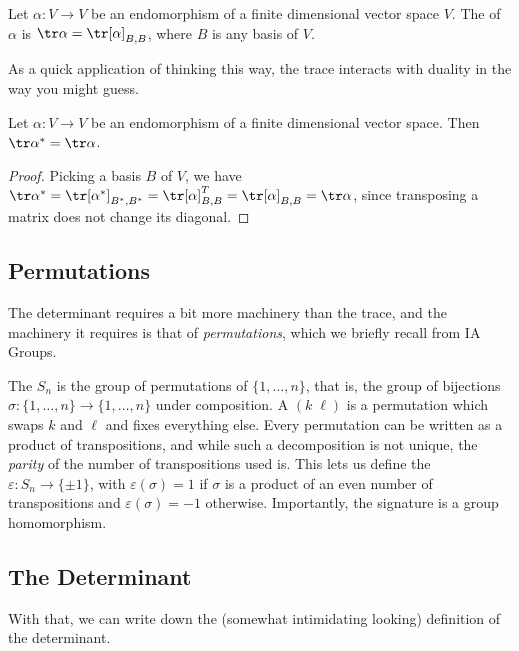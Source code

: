 \documentclass[a4paper]{scrartcl}
\begin{document}
\begin{definition}
    Let $\alpha: V \rightarrow V$ be an endomorphism of a finite dimensional vector space $V$. The  of $\alpha$ is $\tr \alpha = \tr [\alpha]_{B, B}$, where $B$ is any basis of $V$.
\end{definition}

As a quick application of thinking this way, the trace interacts with duality in the way you might guess.

\begin{lemma}
    Let $\alpha : V \rightarrow V$ be an endomorphism of a finite dimensional vector space. Then $\tr \alpha^* = \tr \alpha$.
\end{lemma}
\begin{proof}
    Picking a basis $B$ of $V$, we have $\tr \alpha^* = \tr [\alpha^*]_{B^*, B^*} = \tr [\alpha]_{B, B}^T = \tr [\alpha]_{B, B} = \tr \alpha$, since transposing a matrix does not change its diagonal.
\end{proof}

\subsection{Permutations}

The determinant requires a bit more machinery than the trace, and the machinery it requires is that of \emph{permutations}, which we briefly recall from IA Groups.

The  $S_n$ is the group of permutations of $\{1, \dots, n\}$, that is, the group of bijections $\sigma: \{1, \dots, n\} \rightarrow \{1, \dots, n\}$ under composition. A  $(k \; \ell)$ is a permutation which swaps $k$ and $\ell$ and fixes everything else. Every permutation can be written as a product of transpositions, and while such a decomposition is not unique, the \emph{parity} of the number of transpositions used is. This lets us define the  $\varepsilon: S_n \rightarrow \{\pm 1\}$, with $\varepsilon(\sigma) = 1$ if $\sigma$ is a product of an even number of transpositions and $\varepsilon(\sigma) = -1$ otherwise. Importantly, the signature is a group homomorphism.

\subsection{The Determinant}

With that, we can write down the (somewhat intimidating looking) definition of the determinant.
\end{document}
